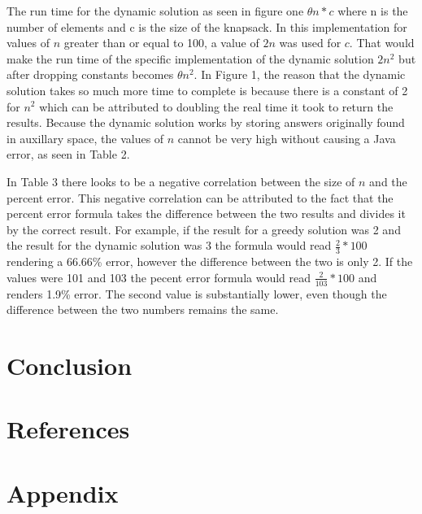 \documentclass[onecolumn, 12pt, article]{IEEEtran}
\numberwithin{case}{problem}
\numberwithin{condition}{problem}
\numberwithin{condition}{subsection}
\numberwithin{definition}{section}
\theoremstyle{remark}
\numberwithin{question}{problem}
\theoremstyle{plain}
\numberwithin{answer}{problem}
\numberwithin{solution}{section}
\numberwithin{equation}{section}%
\begin{document}
The run time for the dynamic solution as seen in figure one $ \theta{n*c} $ where n is the number of elements and c is the size of the knapsack. In this implementation for values of $n$ greater than or equal to 100, a value of $2n$ was used for $c$. That would make the run time of the specific implementation of the dynamic solution $2n^2$ but after dropping constants becomes $ \theta{n^2} $. In Figure 1, the reason that the dynamic solution takes so much more time to complete is because there is a constant of 2 for $n^2$ which can be attributed to doubling the real time it took to return the results. Because the dynamic solution works by storing answers originally found in auxillary space, the values of $n$ cannot be very high without causing a Java error, as seen in Table 2. 

In Table 3 there looks to be a negative correlation between the size of $n$ and the percent error. This negative correlation can be attributed to the fact that the percent error formula takes the difference between the two results and divides it by the correct result. For example, if the result for a greedy solution was 2 and the result for the dynamic solution was 3 the formula would read $ \frac{2}{3} * 100 $ rendering a 66.66\% error, however the difference between the two is only 2. If the values were 101 and 103 the pecent error formula would read $ \frac{2}{103} * 100 $ and renders 1.9\% error. The second value is substantially lower, even though the difference between the two numbers remains the same.


\section{Conclusion}


\newpage

\section*{References}



\newpage

\section*{Appendix}



\end{document}
